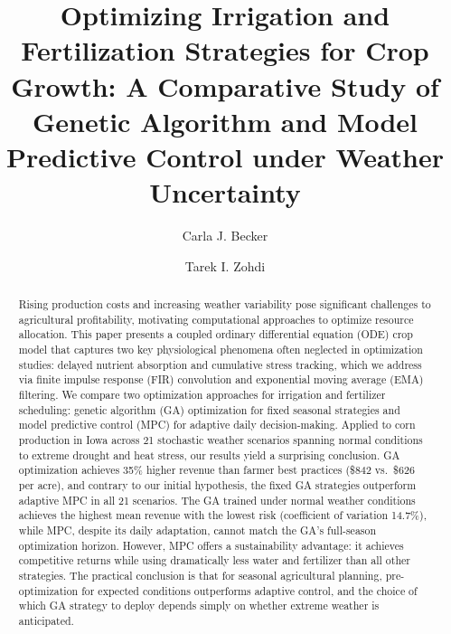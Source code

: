 \documentclass[preprint,12pt]{elsarticle}
\begin{document}
\linenumbers
\begin{frontmatter}
\title{Optimizing Irrigation and Fertilization Strategies for Crop Growth: A Comparative Study of Genetic Algorithm and Model Predictive Control under Weather Uncertainty}

\author{Carla J. Becker}

\author{Tarek I. Zohdi}

\begin{abstract}
Rising production costs and increasing weather variability pose significant challenges to agricultural profitability, motivating computational approaches to optimize resource allocation. This paper presents a coupled ordinary differential equation (ODE) crop model that captures two key physiological phenomena often neglected in optimization studies: delayed nutrient absorption and cumulative stress tracking, which we address via finite impulse response (FIR) convolution and exponential moving average (EMA) filtering. We compare two optimization approaches for irrigation and fertilizer scheduling: genetic algorithm (GA) optimization for fixed seasonal strategies and model predictive control (MPC) for adaptive daily decision-making. Applied to corn production in Iowa across 21 stochastic weather scenarios spanning normal conditions to extreme drought and heat stress, our results yield a surprising conclusion. GA optimization achieves 35\% higher revenue than farmer best practices (\$842 vs.\ \$626 per acre), and contrary to our initial hypothesis, the fixed GA strategies outperform adaptive MPC in all 21 scenarios. The GA trained under normal weather conditions achieves the highest mean revenue with the lowest risk (coefficient of variation 14.7\%), while MPC, despite its daily adaptation, cannot match the GA's full-season optimization horizon. However, MPC offers a sustainability advantage: it achieves competitive returns while using dramatically less water and fertilizer than all other strategies. The practical conclusion is that for seasonal agricultural planning, pre-optimization for expected conditions outperforms adaptive control, and the choice of which GA strategy to deploy depends simply on whether extreme weather is anticipated.
\end{abstract}


\end{frontmatter}
\end{document}
